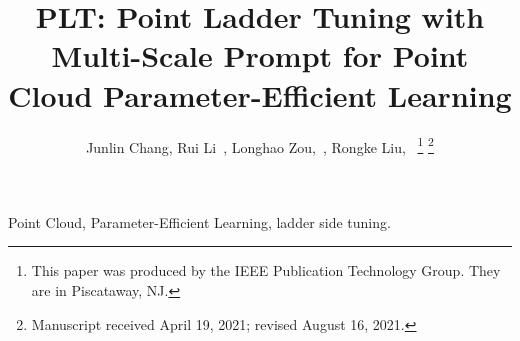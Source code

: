 \documentclass[lettersize,journal]{IEEEtran}
\begin{document}
\title{PLT: Point Ladder Tuning with Multi-Scale Prompt for Point Cloud
Parameter-Efficient Learning}

\author{Junlin Chang, Rui Li~, Longhao Zou,~, Rongke Liu,~
\thanks{This paper was produced by the IEEE Publication Technology Group. They are in Piscataway, NJ.}%
\thanks{Manuscript received April 19, 2021; revised August 16, 2021.}}




\maketitle



\begin{IEEEkeywords}
Point Cloud, Parameter-Efficient Learning, ladder side tuning.
\end{IEEEkeywords}











\end{document}
